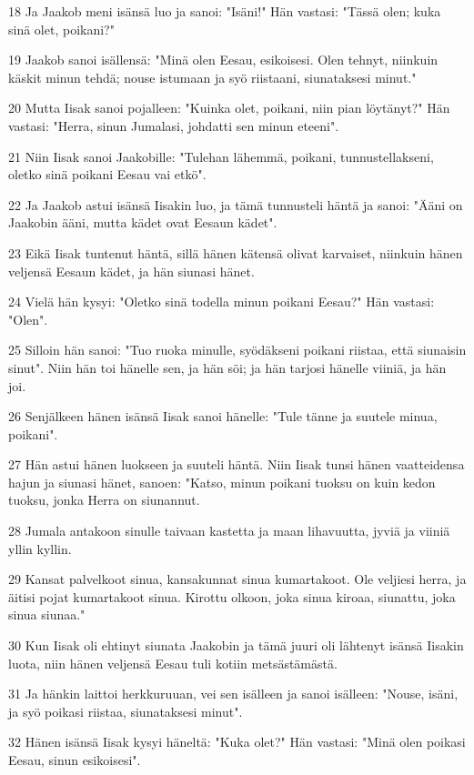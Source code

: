 \par 18 Ja Jaakob meni isänsä luo ja sanoi: "Isäni!" Hän vastasi: "Tässä olen; kuka sinä olet, poikani?"
\par 19 Jaakob sanoi isällensä: "Minä olen Eesau, esikoisesi. Olen tehnyt, niinkuin käskit minun tehdä; nouse istumaan ja syö riistaani, siunataksesi minut."
\par 20 Mutta Iisak sanoi pojalleen: "Kuinka olet, poikani, niin pian löytänyt?" Hän vastasi: "Herra, sinun Jumalasi, johdatti sen minun eteeni".
\par 21 Niin Iisak sanoi Jaakobille: "Tulehan lähemmä, poikani, tunnustellakseni, oletko sinä poikani Eesau vai etkö".
\par 22 Ja Jaakob astui isänsä Iisakin luo, ja tämä tunnusteli häntä ja sanoi: "Ääni on Jaakobin ääni, mutta kädet ovat Eesaun kädet".
\par 23 Eikä Iisak tuntenut häntä, sillä hänen kätensä olivat karvaiset, niinkuin hänen veljensä Eesaun kädet, ja hän siunasi hänet.
\par 24 Vielä hän kysyi: "Oletko sinä todella minun poikani Eesau?" Hän vastasi: "Olen".
\par 25 Silloin hän sanoi: "Tuo ruoka minulle, syödäkseni poikani riistaa, että siunaisin sinut". Niin hän toi hänelle sen, ja hän söi; ja hän tarjosi hänelle viiniä, ja hän joi.
\par 26 Senjälkeen hänen isänsä Iisak sanoi hänelle: "Tule tänne ja suutele minua, poikani".
\par 27 Hän astui hänen luokseen ja suuteli häntä. Niin Iisak tunsi hänen vaatteidensa hajun ja siunasi hänet, sanoen: "Katso, minun poikani tuoksu on kuin kedon tuoksu, jonka Herra on siunannut.
\par 28 Jumala antakoon sinulle taivaan kastetta ja maan lihavuutta, jyviä ja viiniä yllin kyllin.
\par 29 Kansat palvelkoot sinua, kansakunnat sinua kumartakoot. Ole veljiesi herra, ja äitisi pojat kumartakoot sinua. Kirottu olkoon, joka sinua kiroaa, siunattu, joka sinua siunaa."
\par 30 Kun Iisak oli ehtinyt siunata Jaakobin ja tämä juuri oli lähtenyt isänsä Iisakin luota, niin hänen veljensä Eesau tuli kotiin metsästämästä.
\par 31 Ja hänkin laittoi herkkuruuan, vei sen isälleen ja sanoi isälleen: "Nouse, isäni, ja syö poikasi riistaa, siunataksesi minut".
\par 32 Hänen isänsä Iisak kysyi häneltä: "Kuka olet?" Hän vastasi: "Minä olen poikasi Eesau, sinun esikoisesi".
